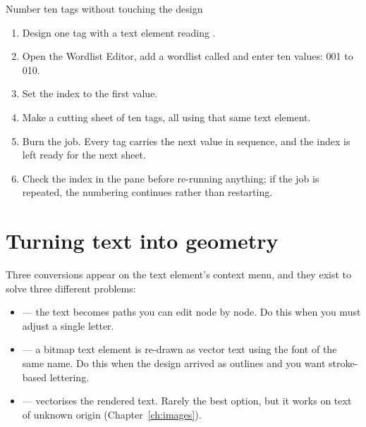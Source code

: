 \begin{walkthrough}{Number ten tags without touching the design}
\begin{enumerate}[label=\arabic*.,leftmargin=1.4em]
  \item Design one tag with a text element reading .
  \item Open the Wordlist Editor, add a wordlist called  and enter
        ten values: 001 to 010.
  \item Set the index to the first value.
  \item Make a cutting sheet of ten tags, all using that same text element.
  \item Burn the job. Every tag carries the next value in sequence, and the index
        is left ready for the next sheet.
  \item Check the index in the  pane before re-running anything;
        if the job is repeated, the numbering continues rather than restarting.
\end{enumerate}
\end{walkthrough}

\section{Turning text into geometry}

Three conversions appear on the text element's context menu, and they exist to
solve three different problems:

\begin{itemize}
  \item {} --- the text becomes paths you can edit node by
        node. Do this when you must adjust a single letter.
  \item {} --- a bitmap text element is re-drawn as
        vector text using the font of the same name. Do this when the design
        arrived as outlines and you want stroke-based lettering.
  \item {} --- vectorises the rendered text. Rarely the best
        option, but it works on text of unknown origin
        (Chapter~\ref{ch:images}).
\end{itemize}

